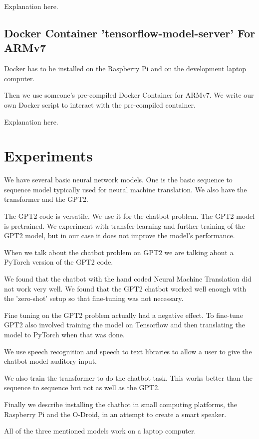 Explanation here.

\subsection*{Docker Container 'tensorflow-model-server' For ARMv7}
Docker has to be installed on the Raspberry Pi and on the development laptop computer.

Then we use someone's pre-compiled Docker Container for ARMv7. We write our own Docker script to interact with the pre-compiled container.

Explanation here.

\section{Experiments}

We have several basic neural network models. One is the basic sequence
to sequence model typically used for neural machine translation. We also have the transformer and
the GPT2.

The GPT2 code is versatile. We use it for the chatbot problem. The GPT2 model
is pretrained. We experiment with transfer learning and further training of the GPT2 model, but
in our case it does not improve the model's performance. 

When we talk about the chatbot problem on GPT2 we are talking about a PyTorch version of the 
GPT2 code. 

We found that the chatbot with the hand coded Neural Machine Translation did not work 
very well. We found that the GPT2 chatbot worked well enough with the 'zero-shot' setup so that
fine-tuning was not necessary. 

Fine tuning on the GPT2 problem actually had a negative effect. To fine-tune GPT2 also involved
training the model on Tensorflow and then translating the model to PyTorch when that was done. 

We use speech recognition and speech to text libraries to allow a user to give the chatbot model 
auditory input.

We also train the transformer to do the chatbot task. This works better than the sequence to 
sequence but not as well as the GPT2.

Finally we describe installing the chatbot in small computing platforms, the Raspberry Pi and the O-Droid, in an attempt to create a smart speaker.

All of the three mentioned models work on a laptop computer.

